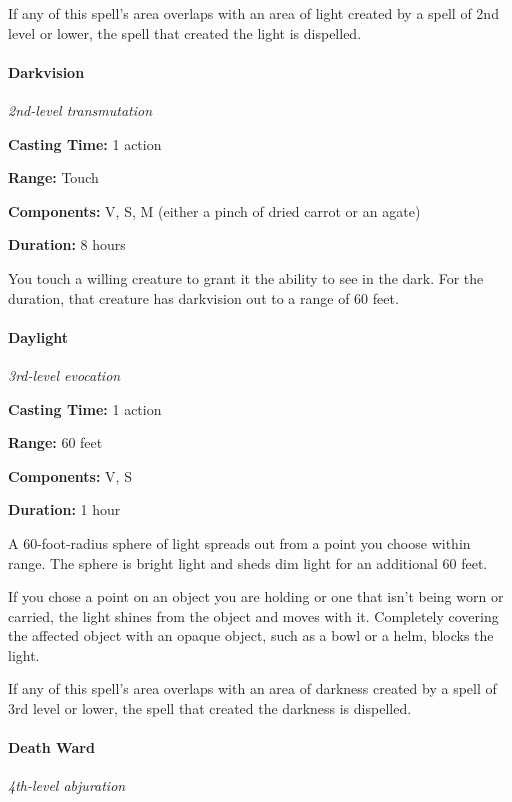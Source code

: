 \documentclass[
]{article}
\begin{document}
If any of this spell's area overlaps with an area of light created by a
spell of 2nd level or lower, the spell that created the light is
dispelled.

\hypertarget{darkvision}{%
\paragraph{Darkvision}\label{darkvision}}

\emph{2nd-level transmutation}

\textbf{Casting Time:} 1 action

\textbf{Range:} Touch

\textbf{Components:} V, S, M (either a pinch of dried carrot or an
agate)

\textbf{Duration:} 8 hours

You touch a willing creature to grant it the ability to see in the dark.
For the duration, that creature has darkvision out to a range of 60
feet.

\hypertarget{daylight}{%
\paragraph{Daylight}\label{daylight}}

\emph{3rd-level evocation}

\textbf{Casting Time:} 1 action

\textbf{Range:} 60 feet

\textbf{Components:} V, S

\textbf{Duration:} 1 hour

A 60-foot-radius sphere of light spreads out from a point you choose
within range. The sphere is bright light and sheds dim light for an
additional 60 feet.

If you chose a point on an object you are holding or one that isn't
being worn or carried, the light shines from the object and moves with
it. Completely covering the affected object with an opaque object, such
as a bowl or a helm, blocks the light.

If any of this spell's area overlaps with an area of darkness created by
a spell of 3rd level or lower, the spell that created the darkness is
dispelled.

\hypertarget{death-ward}{%
\paragraph{Death Ward}\label{death-ward}}

\emph{4th-level abjuration}
\end{document}
